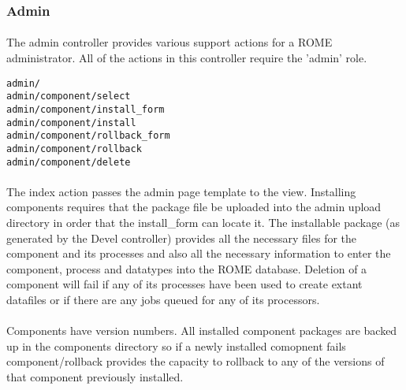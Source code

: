 \subsubsection{Admin}
\label{sec:controller_admin}

\paragraph{}
The admin controller provides various support actions for a ROME administrator. All of the actions in this controller require the 'admin' role.

\begin{scriptsize}
\begin{verbatim}
admin/
admin/component/select
admin/component/install_form
admin/component/install
admin/component/rollback_form
admin/component/rollback
admin/component/delete 
\end{verbatim}
\end{scriptsize}

\paragraph{}
The index action passes the admin page template to the view. Installing components requires that the package file be uploaded into the admin upload directory in order that the install\_form can locate it. The installable package (as generated by the Devel controller) provides all the necessary files for the component and its processes and also all the necessary information to enter the component, process and datatypes into the ROME database. Deletion of a component will fail if any of its processes have been used to create extant datafiles or if there are any jobs queued for any of its processors. 

\paragraph{}
Components have version numbers. All installed component packages are backed up in the components directory so if a newly installed comopnent fails component/rollback provides the capacity to rollback to any of the versions of that component previously installed.